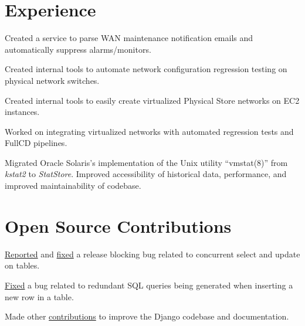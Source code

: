 \documentclass[]{resume}
\begin{document}
\begin{minipage}[t]{0.70\textwidth}

\section{Experience}

\subsectionsep
\begin{tightemize}
\item Created a service to parse WAN maintenance notification emails and
automatically suppress alarms/monitors.
\item Created internal tools to automate network configuration regression
testing on physical network switches.
\item Created internal tools to easily create virtualized Physical Store
networks on EC2 instances.
\item Worked on integrating virtualized networks with automated regression
tests and FullCD pipelines.
\end{tightemize}
\subsectionsep

\begin{tightemize}
\item Migrated Oracle Solaris's implementation of the Unix
utility ``vmstat(8)'' from \textit{kstat2} to \textit{StatStore}. Improved accessibility of historical data, performance, and improved maintainability of codebase.
\end{tightemize}

\section{Open Source Contributions}
\begin{tightemize}
\item \href{https://code.djangoproject.com/ticket/31246}{Reported} and \href{https://github.com/django/django/pull/12434}{fixed}
a release blocking bug related to concurrent select and update on tables.
\item \justifying\href{https://github.com/django/django/pull/12496}{Fixed} a bug related to redundant SQL queries being generated when
inserting a new row in a table.
\item \justifying Made other \href{https://github.com/django/django/pulls?q=author\%3Aabhijeetviswa}{contributions} to improve the Django codebase and
documentation.
\end{tightemize}
\primarysectionsep


\end{minipage}
\end{document}
